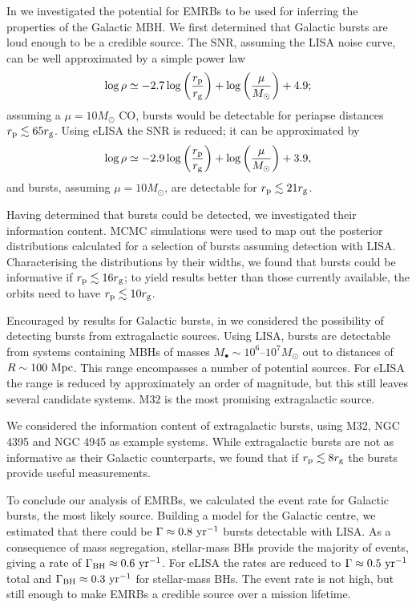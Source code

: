 In  we investigated the potential for EMRBs to be used for inferring the properties of the Galactic MBH. We first determined that Galactic bursts are loud enough to be a credible source. The SNR, assuming the LISA noise curve, can be well approximated by a simple power law
\begin{equation}
\log\rho \simeq -2.7\log\left(\dfrac{r_\mathrm{p}}{r_\mathrm{g}}\right) + \log\left(\dfrac{\mu}{M_\odot}\right) + 4.9;
\end{equation}
assuming a $\mu = 10 M_\odot$ CO, bursts would be detectable for periapse distances $r_\mathrm{p} \lesssim 65 r_\mathrm{g}$. Using eLISA the SNR is reduced; it can be approximated by 
\begin{equation}
\log\rho \simeq -2.9\log\left(\dfrac{r_\mathrm{p}}{r_\mathrm{g}}\right) + \log\left(\dfrac{\mu}{M_\odot}\right) + 3.9,
\end{equation}
and bursts, assuming $\mu = 10 M_\odot$, are detectable for $r_\mathrm{p} \lesssim 21 r_\mathrm{g}$.

Having determined that bursts could be detected, we investigated their information content. MCMC simulations were used to map out the posterior distributions calculated for a selection of bursts assuming detection with LISA. Characterising the distributions by their widths, we found that bursts could be informative if $r_\mathrm{p} \lesssim 16 r_\mathrm{g}$; to yield results better than those currently available, the orbits need to have $r_\mathrm{p} \lesssim 10 r_\mathrm{g}$.

Encouraged by results for Galactic bursts, in  we considered the possibility of detecting bursts from extragalactic sources. Using LISA, bursts are detectable from systems containing MBHs of masses $M_\bullet \sim 10^6$--$10^7 M_\odot$ out to distances of $R \sim 100~\mathrm{Mpc}$. This range encompasses a number of potential sources. For eLISA the range is reduced by approximately an order of magnitude, but this still leaves several candidate systems. M32 is the most promising extragalactic source.

We considered the information content of extragalactic bursts, using M32, NGC 4395 and NGC 4945 as example systems. While extragalactic bursts are not as informative as their Galactic counterparts, we found that if $r_\mathrm{p} \lesssim 8 r_\mathrm{g}$ the bursts provide useful measurements.

To conclude our analysis of EMRBs, we calculated the event rate for Galactic bursts, the most likely source. Building a model for the Galactic centre, we estimated that there could be $\Gamma \approx 0.8~\mathrm{yr^{-1}}$ bursts detectable with LISA. As a consequence of mass segregation, stellar-mass BHs provide the majority of events, giving a rate of $\Gamma_\mathrm{BH} \approx 0.6~\mathrm{yr^{-1}}$. For eLISA the rates are reduced to $\Gamma \approx 0.5~\mathrm{yr^{-1}}$ total and $\Gamma_\mathrm{BH} \approx 0.3~\mathrm{yr^{-1}}$ for stellar-mass BHs. The event rate is not high, but still enough to make EMRBs a credible source over a mission lifetime.

